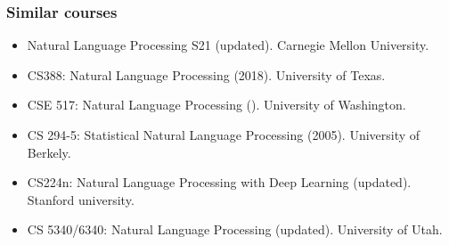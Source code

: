 \documentclass{beamer}
\begin{document}
\begin{frame}
	\frametitle{Similar courses}
	
	\begin{itemize}
			
			\item Natural Language Processing S21 (updated).
			Carnegie Mellon University. 
			
			\item CS388: Natural Language Processing (2018). 
			University of Texas. 
			
			\item CSE 517: Natural Language Processing ().
			University of Washington.
			
			\item CS 294-5: Statistical Natural Language Processing (2005). 
			University of Berkely. 
			
			\item CS224n: Natural Language Processing with Deep Learning (updated).
			Stanford university.
			
			\item CS 5340/6340: Natural Language Processing (updated). 
			University of Utah.
		
	\end{itemize}
	
\end{frame}
\end{document}
